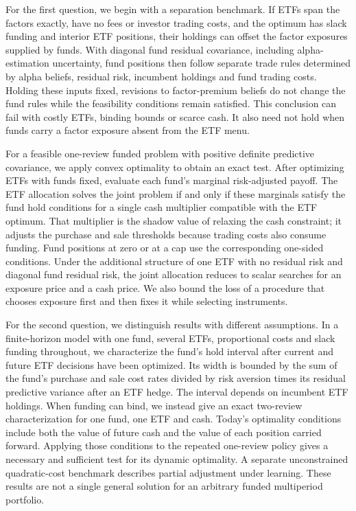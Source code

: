 \documentclass[11pt]{article}
\begin{document}
For the first question, we begin with a separation benchmark. If ETFs span the factors exactly, have no fees or investor trading costs, and the optimum has slack funding and interior ETF positions, their holdings can offset the factor exposures supplied by funds. With diagonal fund residual covariance, including alpha-estimation uncertainty, fund positions then follow separate trade rules determined by alpha beliefs, residual risk, incumbent holdings and fund trading costs. Holding these inputs fixed, revisions to factor-premium beliefs do not change the fund rules while the feasibility conditions remain satisfied. This conclusion can fail with costly ETFs, binding bounds or scarce cash. It also need not hold when funds carry a factor exposure absent from the ETF menu.

For a feasible one-review funded problem with positive definite predictive covariance, we apply convex optimality to obtain an exact test. After optimizing ETFs with funds fixed, evaluate each fund's marginal risk-adjusted payoff. The ETF allocation solves the joint problem if and only if these marginals satisfy the fund hold conditions for a single cash multiplier compatible with the ETF optimum. That multiplier is the shadow value of relaxing the cash constraint; it adjusts the purchase and sale thresholds because trading costs also consume funding. Fund positions at zero or at a cap use the corresponding one-sided conditions. Under the additional structure of one ETF with no residual risk and diagonal fund residual risk, the joint allocation reduces to scalar searches for an exposure price and a cash price. We also bound the loss of a procedure that chooses exposure first and then fixes it while selecting instruments.

For the second question, we distinguish results with different assumptions. In a finite-horizon model with one fund, several ETFs, proportional costs and slack funding throughout, we characterize the fund's hold interval after current and future ETF decisions have been optimized. Its width is bounded by the sum of the fund's purchase and sale cost rates divided by risk aversion times its residual predictive variance after an ETF hedge. The interval depends on incumbent ETF holdings. When funding can bind, we instead give an exact two-review characterization for one fund, one ETF and cash. Today's optimality conditions include both the value of future cash and the value of each position carried forward. Applying those conditions to the repeated one-review policy gives a necessary and sufficient test for its dynamic optimality. A separate unconstrained quadratic-cost benchmark describes partial adjustment under learning. These results are not a single general solution for an arbitrary funded multiperiod portfolio.
\end{document}
